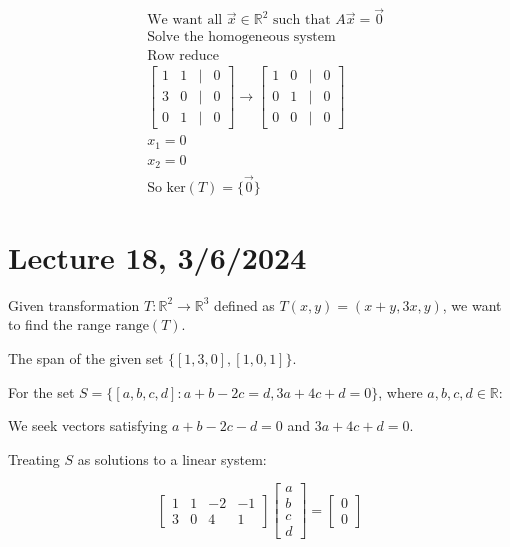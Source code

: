 \documentclass{article}
\begin{document}
\[
\begin{aligned}
    &\text{We want all } \vec{x} \in \mathbb{R}^2 \text{ such that } A\vec{x} = \vec{0} \\
    &\text{Solve the homogeneous system} \\
    &\text{Row reduce} \\
    &\begin{bmatrix}
        1 & 1 & | & 0 \\
        3 & 0 & | & 0 \\
        0 & 1 & | & 0
    \end{bmatrix}
    \rightarrow
    \begin{bmatrix}
        1 & 0 & | & 0 \\
        0 & 1 & | & 0 \\
        0 & 0 & | & 0
    \end{bmatrix} \\
    &x_1 = 0 \\
    &x_2 = 0 \\
    &\text{So } \text{ker}(T) = \{\vec{0}\}
\end{aligned}
\]


\section{Lecture 18, 3/6/2024}

Given transformation \( T: \mathbb{R}^2 \rightarrow \mathbb{R}^3 \) defined as \( T(x,y) = (x+y, 3x, y) \), we want to find the range \( \text{range}(T) \).

The span of the given set \( \{ [1, 3, 0], [1, 0, 1] \} \).

For the set \( S = \{ [a, b, c, d] : a+b-2c=d, 3a+4c+d=0 \} \), where \( a, b, c, d \in \mathbb{R} \):

We seek vectors satisfying \( a+b-2c-d=0 \) and \( 3a+4c+d=0 \).

Treating \( S \) as solutions to a linear system:

\[
\begin{bmatrix}
1 & 1 & -2 & -1 \\
3 & 0 & 4 & 1
\end{bmatrix}
\begin{bmatrix}
a \\
b \\
c \\
d
\end{bmatrix}
=
\begin{bmatrix}
0 \\
0
\end{bmatrix}
\]
\end{document}
